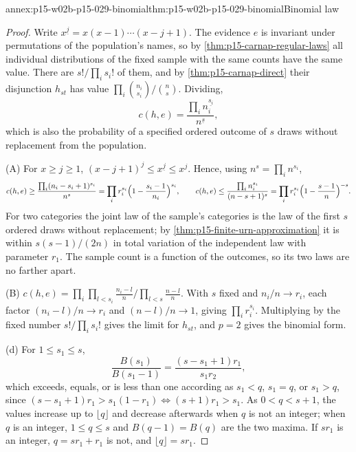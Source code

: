 \begin{annexitem}{annex:p15-w02b-p15-029-binomial}{thm:p15-w02b-p15-029-binomial}{Binomial law}
\begin{proof}
Write \(x^{\underline j}=x(x-1)\cdots(x-j+1)\). The evidence \(e\) is
invariant under permutations of the population's names, so by
\cref{thm:p15-carnap-regular-laws} all individual distributions of
the fixed sample with the same counts have the same value. There are
\(s!/\prod_is_i!\) of them, and by \cref{thm:p15-carnap-direct} their
disjunction \(h_{st}\) has value \(\prod_i\binom{n_i}{s_i}/\binom ns\).
Dividing,
\[
 c(h,e)=\frac{\prod_in_i^{\underline{s_i}}}{n^{\underline s}},
\]
which is also the probability of a specified ordered outcome of \(s\)
draws without replacement from the population.

(A) For \(x\geq j\geq1\),
\((x-j+1)^j\leq x^{\underline j}\leq x^j\). Hence, using
\(n^s=\prod_in^{s_i}\),
\[
 c(h,e)\geq\frac{\prod_i(n_i-s_i+1)^{s_i}}{n^s}
 =\prod_ir_i^{s_i}\Bigl(1-\frac{s_i-1}{n_i}\Bigr)^{s_i},\qquad
 c(h,e)\leq\frac{\prod_in_i^{s_i}}{(n-s+1)^s}
 =\prod_ir_i^{s_i}\Bigl(1-\frac{s-1}n\Bigr)^{-s}.
\]
For two categories the joint law of the sample's categories is the
law of the first \(s\) ordered draws without replacement; by
\cref{thm:p15-finite-urn-approximation} it is within
\(s(s-1)/(2n)\) in total variation of the independent law with
parameter \(r_1\). The sample count is a function of the outcomes, so
its two laws are no farther apart.

(B) \(c(h,e)=\prod_i\prod_{l<s_i}\frac{n_i-l}n\Big/\prod_{l<s}\frac{n-l}n\).
With \(s\) fixed and \(n_i/n\to r_i\), each factor
\((n_i-l)/n\to r_i\) and \((n-l)/n\to1\), giving
\(\prod_ir_i^{s_i}\). Multiplying by the fixed number
\(s!/\prod_is_i!\) gives the limit for \(h_{st}\), and \(p=2\) gives the
binomial form.

(d) For \(1\leq s_1\leq s\),
\[
 \frac{B(s_1)}{B(s_1-1)}=\frac{(s-s_1+1)r_1}{s_1r_2},
\]
which exceeds, equals, or is less than one according as \(s_1<q\),
\(s_1=q\), or \(s_1>q\), since
\((s-s_1+1)r_1>s_1(1-r_1)\iff(s+1)r_1>s_1\). As
\(0<q<s+1\), the values increase up to \(\lfloor q\rfloor\) and
decrease afterwards when \(q\) is not an integer; when \(q\) is an
integer, \(1\leq q\leq s\) and \(B(q-1)=B(q)\) are the two maxima. If
\(sr_1\) is an integer, \(q=sr_1+r_1\) is not, and
\(\lfloor q\rfloor=sr_1\).
\end{proof}
\end{annexitem}

